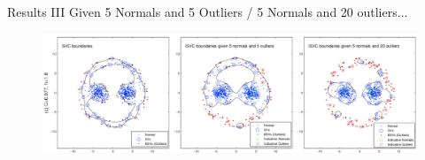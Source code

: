 \begin{frame}{Results III}
Given 5 Normals and 5 Outliers / 5 Normals and 20 outliers...
\begin{figure}
\centering
\includegraphics[scale=0.28]{imgs/syn_01_03.pdf}\\
\end{figure}
\end{frame}


